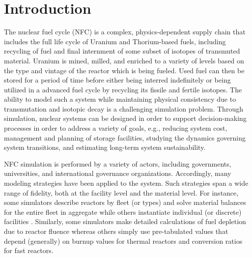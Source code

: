 \section{Introduction}

The nuclear fuel cycle (NFC) is a complex, physics-dependent supply chain that
includes the full life cycle of Uranium and Thorium-based fuels, including
recycling of fuel and final internment of some subset of isotopes of transmuted
material. Uranium is mined, milled, and enriched to a variety of levels based on
the type and vintage of the reactor which is being fueled. Used fuel can then be
stored for a period of time before either being interred indefinitely or being
utilized in a advanced fuel cycle by recycling its fissile and fertile
isotopes. The ability to model such a system while maintaining physical
consistency due to transmutation and isotopic decay is a challenging simulation
problem. Through simulation, nuclear systems can be designed in order to support
decision-making processes in order to address a variety of goals, e.g., reducing
system cost, management and planning of storage facilities, studying the
dynamics governing system transitions, and estimating long-term system
sustainability.

NFC simulation is performed by a variety of actors, including governments,
universities, and international governance organizations. Accordingly, many
modeling strategies have been applied to the system. Such strategies span a wide
range of fidelity, both at the facility level and the material level. For
instance, some simulators describe reactors by fleet (or types) and solve
material balances for the entire fleet in aggregate
\cite{busquim_e_silva_system_2008,yacout_vision_2006} while others instantiate
individual (or discrete) facilities \cite{schneider_nfcsim:_2005}. Similarly,
some simulators make detailed calculations of fuel depletion due to reactor
fluence \cite{boucher_cosi:_2006} whereas others simply use pre-tabulated values
that depend (generally) on burnup values for thermal reactors and conversion
ratios for fast reactors.


